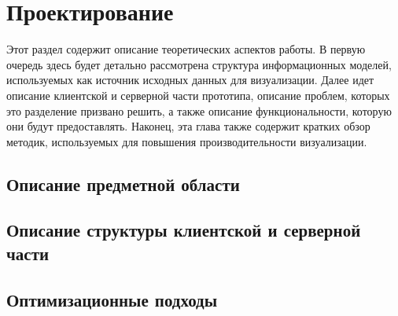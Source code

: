 ﻿\section{Проектирование}

Этот раздел содержит описание теоретических аспектов работы.
В первую очередь здесь будет детально рассмотрена
структура информационных моделей,
используемых как источник исходных данных для визуализации.
Далее идет описание клиентской и серверной части прототипа,
описание проблем, которых это разделение призвано решить,
а также описание функциональности, которую они будут предоставлять.
Наконец, эта глава также содержит кратких обзор методик,
используемых для повышения производительности визуализации.

\subsection{Описание предметной области}
\lipsum[4]

\subsection{Описание структуры клиентской и серверной части}
\lipsum[5]

\subsection{Оптимизационные подходы}
\lipsum[6]